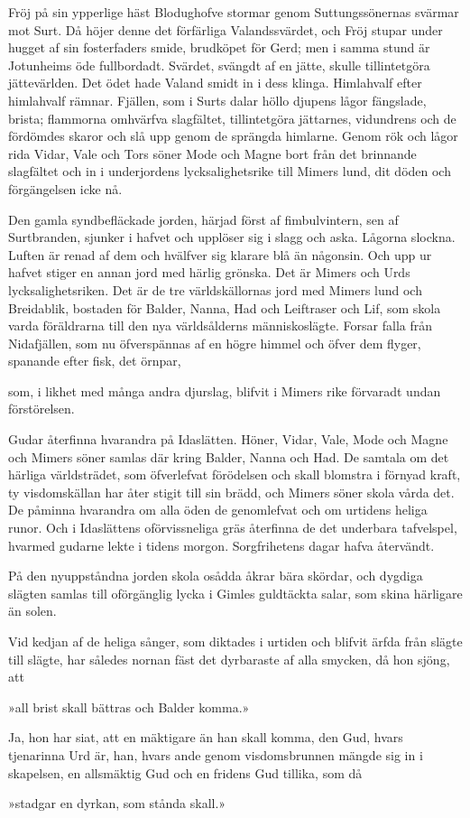 Fröj på sin ypperlige häst Blodughofve stormar genom Suttungssönernas
svärmar mot Surt. Då höjer denne det förfärliga Valandssvärdet, och Fröj
stupar under hugget af sin fosterfaders smide, brudköpet för Gerd; men i
samma stund är Jotunheims öde fullbordadt. Svärdet, svängdt af en jätte,
skulle tillintetgöra jättevärlden. Det ödet hade Valand smidt in i dess
klinga. Himlahvalf efter himlahvalf rämnar. Fjällen, som i Surts dalar
höllo djupens lågor fängslade, brista; flammorna omhvärfva slagfältet,
tillintetgöra jättarnes, vidundrens och de fördömdes skaror och slå upp
genom de sprängda himlarne. Genom rök och lågor rida Vidar, Vale och
Tors söner Mode och Magne bort från det brinnande slagfältet och in i
underjordens lycksalighetsrike till Mimers lund, dit döden och
förgängelsen icke nå.

Den gamla syndbefläckade jorden, härjad först af fimbulvintern, sen af
Surtbranden, sjunker i hafvet och upplöser sig i slagg och aska. Lågorna
slockna. Luften är renad af dem och hvälfver sig klarare blå än
någonsin. Och upp ur hafvet stiger en annan jord med härlig grönska. Det
är Mimers och Urds lycksalighetsriken. Det är de tre världskällornas
jord med Mimers lund och Breidablik, bostaden för Balder, Nanna, Had och
Leiftraser och Lif, som skola varda föräldrarna till den nya
världsålderns människoslägte. Forsar falla från Nidafjällen, som nu
öfverspännas af en högre himmel och öfver dem flyger, spanande efter
fisk, det örnpar,

som, i likhet med många andra djurslag, blifvit i Mimers rike förvaradt
undan förstörelsen.

Gudar återfinna hvarandra på Idaslätten. Höner, Vidar, Vale, Mode och
Magne och Mimers söner samlas där kring Balder, Nanna och Had. De
samtala om det härliga världsträdet, som öfverlefvat förödelsen och
skall blomstra i förnyad kraft, ty visdomskällan har åter stigit till
sin brädd, och Mimers söner skola vårda det. De påminna hvarandra om
alla öden de genomlefvat och om urtidens heliga runor. Och i Idaslättens
oförvissneliga gräs återfinna de det underbara tafvelspel, hvarmed
gudarne lekte i tidens morgon. Sorgfrihetens dagar hafva återvändt.

På den nyuppståndna jorden skola osådda åkrar bära skördar, och dygdiga
slägten samlas till oförgänglig lycka i Gimles guldtäckta salar, som
skina härligare än solen.

Vid kedjan af de heliga sånger, som diktades i urtiden och blifvit ärfda
från slägte till slägte, har således nornan fäst det dyrbaraste af alla
smycken, då hon sjöng, att

{»all brist skall bättras}
{och Balder komma.»}

Ja, hon har siat, att en mäktigare än han skall komma, den Gud, hvars
tjenarinna Urd är, han, hvars ande genom visdomsbrunnen mängde sig in i
skapelsen, en allsmäktig Gud och en fridens Gud tillika, som då

{»stadgar en dyrkan,}
{som stånda skall.»}


\bye
